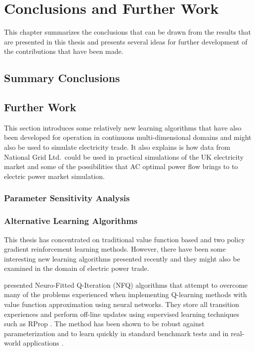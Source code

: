 \chapter{Conclusions and Further Work}
\label{ch:conclusion}
This chapter summarizes the conclusions that can be drawn from the
results that are presented in this thesis and presents several ideas for
further development of the contributions that have been made.

\section{Summary Conclusions}


\section{Further Work}
\label{sec:furtherwork}
This section introduces some relatively new learning algorithms that have
also been developed for operation in continuous multi-dimensional domains and
might also be used to simulate electricity trade.
It also explains is how data from National Grid Ltd.~could be used in practical
simulations of the UK electricity market and some of the possibilities that AC
optimal power flow brings to to electric power market simulation.

\subsection{Parameter Sensitivity Analysis}

\subsection{Alternative Learning Algorithms}


This thesis has concentrated on traditional value function based and two policy
gradient reinforcement learning methods.  However, there have been some
interesting new learning algorithms presented recently and they might also be
examined in the domain of electric power trade.

 presented Neuro-Fitted Q-Iteration (NFQ) algorithms
that attempt to overcome many of the problems experienced when implementing
Q-learning methods with value function approximation using neural networks.
They store all transition experiences and perform off-line updates using
supervised learning techniques such as RProp \cite{riedmiller93}.  The method
has been shown to be robust against parameterization and to learn quickly in
standard benchmark tests and in real-world applications \cite{kietzmann09}.

